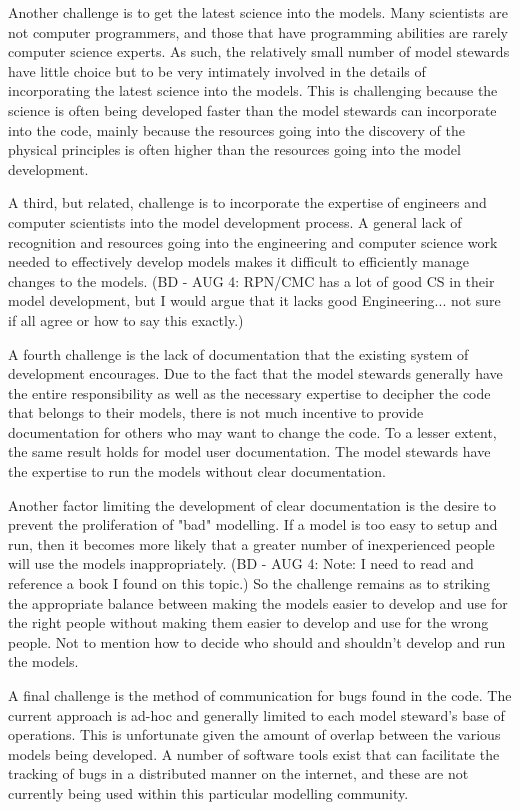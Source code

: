 \documentclass[hess]{copernicus}
\begin{document}
Another challenge is to get the latest science into the models. Many scientists are not computer programmers, and those that have programming abilities are rarely computer science experts. As such, the relatively small number of model stewards have little choice but to be very intimately involved in the details of incorporating the latest science into the models. This is challenging because the science is often being developed faster than the model stewards can incorporate into the code, mainly because the resources going into the discovery of the physical principles is often higher than the resources going into the model development.

A third, but related, challenge is to incorporate the expertise of engineers and computer scientists into the model development process. A general lack of recognition and resources going into the engineering and computer science work needed to effectively develop models makes it difficult to efficiently manage changes to the models. (BD - AUG 4: RPN/CMC has a lot of good CS in their model development, but I would argue that it lacks good Engineering... not sure if all agree or how to say this exactly.)

A fourth challenge is the lack of documentation that the existing system of development encourages. Due to the fact that the model stewards generally have the entire responsibility as well as the necessary expertise to decipher the code that belongs to their models, there is not much incentive to provide documentation for others who may want to change the code. To a lesser extent, the same result holds for model user documentation. The model stewards have the expertise to run the models without clear documentation. 

Another factor limiting the development of clear documentation is the desire to prevent the proliferation of "bad" modelling. If a model is too easy to setup and run, then it becomes more likely that a greater number of inexperienced people will use the models inappropriately. (BD - AUG 4: Note: I need to read and reference a book I found on this topic.) So the challenge remains as to striking the appropriate balance between making the models easier to develop and use for the right people without making them easier to develop and use for the wrong people. Not to mention how to decide who should and shouldn't develop and run the models.

A final challenge is the method of communication for bugs found in the code. The current approach is ad-hoc and generally limited to each model steward's base of operations. This is unfortunate given the amount of overlap between the various models being developed. A number of software tools exist that can facilitate the tracking of bugs in a distributed manner on the internet, and these are not currently being used within this particular modelling community.
\end{document}
